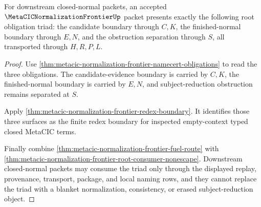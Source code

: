\begin{theorem}
\label{thm:metacic-normalization-frontier-root-obligation-triad}
For downstream closed-normal packets, an accepted $\MetaCICNormalizationFrontierUp$ packet presents exactly the following root obligation triad: the candidate boundary through $C,K$, the finished-normal boundary through $E,N$, and the obstruction separation through $S$, all transported through $H,R,P,L$.
\end{theorem}
\begin{proof}
Use \autoref{thm:metacic-normalization-frontier-namecert-obligations} to read the three obligations. The candidate-evidence boundary is carried by $C,K$, the finished-normal boundary is carried by $E,N$, and subject-reduction obstruction remains separated at $S$.

Apply \autoref{thm:metacic-normalization-frontier-redex-boundary}. It identifies those three surfaces as the finite redex boundary for inspected empty-context typed closed MetaCIC terms.

Finally combine \autoref{thm:metacic-normalization-frontier-fuel-route} with \autoref{thm:metacic-normalization-frontier-root-consumer-nonescape}. Downstream closed-normal packets may consume the triad only through the displayed replay, provenance, transport, package, and local naming rows, and they cannot replace the triad with a blanket normalization, consistency, or erased subject-reduction object.
\end{proof}

